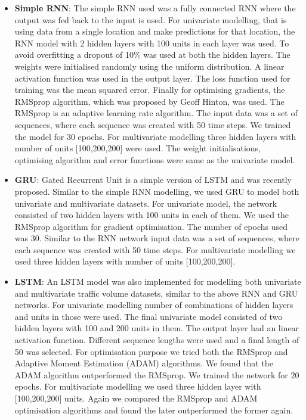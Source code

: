 \begin{itemize}

\item \textbf{Simple RNN}: The simple RNN used was a fully connected RNN where the output was fed
back to the input is used. For univariate modelling, that is using data from a single location and
make predictions for that location, the RNN model with 2 hidden layers with 100 units in each
layer was used. To avoid overfitting a dropout of 10\% was used at both the hidden layers. The weights
were initialised randomly using the uniform distribution. A linear activation function was used
in the output layer. The loss function used for training was the mean squared error. Finally for
optimising gradients, the RMSprop algorithm, which was proposed by Geoff Hinton, was used.
The RMSprop is an adaptive learning rate algorithm. The input data was a set of sequences, where
each sequence was created with 50 time steps. We trained the model for 30 epochs.
For multivariate modelling three hidden layers with number of units [100,200,200] were used.
The weight initialisations, optimising algorithm and error functions were same as the univariate model.

\item \textbf{GRU}: Gated Recurrent Unit is a simple version of LSTM and was recently proposed.
Similar to the simple RNN modelling, we used GRU to model both univariate and multivariate datasets.
For univariate model, the network consisted of two hidden layers with 100 units in each of them.
We used the RMSprop algorithm for gradient optimisation. The number of epochs used was 30. Similar to
the RNN network input data was a set of sequences, where each sequence was created with 50 time steps.
For multivariate modelling we used three hidden layers with number of units [100,200,200].

\item \textbf{LSTM}: An LSTM model was also implemented for modelling both univariate and multivariate
traffic volume datasets, similar to the above RNN and GRU networks. For univariate modelling number
of combinations of hidden layers and units in those were used. The final univariate model consisted
of two hidden layers with 100 and 200 units in them. The output layer had an linear activation function.
Different sequence lengths were used and a final length of 50 was selected. For optimisation purpose
we tried both the RMSprop and Adaptive Moment Estimation (ADAM) algorithms. We found that the
ADAM algorithm outperformed the RMSprop. We trained the network for 20 epochs. For multivariate
modelling we used three hidden layer with [100,200,200] units. Again we compared the RMSprop and ADAM
optimisation algorithms and found the later outperformed the former again.

\end{itemize}


